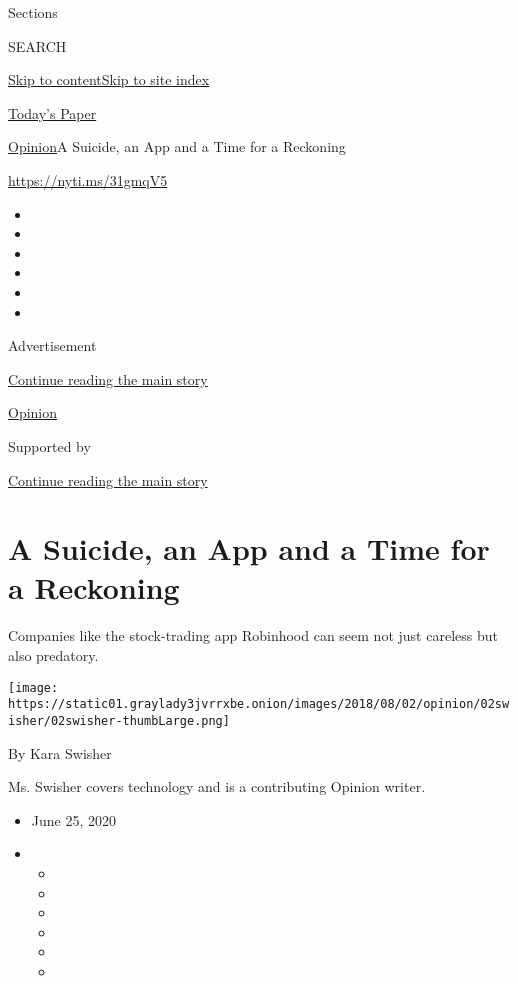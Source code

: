 Sections

SEARCH

\protect\hyperlink{site-content}{Skip to
content}\protect\hyperlink{site-index}{Skip to site index}

\href{https://myaccount.nytimes3xbfgragh.onion/auth/login?response_type=cookie\&client_id=vi}{}

\href{https://www.nytimes3xbfgragh.onion/section/todayspaper}{Today's
Paper}

\href{/section/opinion}{Opinion}\textbar{}A Suicide, an App and a Time
for a Reckoning

\url{https://nyti.ms/31gmqV5}

\begin{itemize}
\item
\item
\item
\item
\item
\item
\end{itemize}

Advertisement

\protect\hyperlink{after-top}{Continue reading the main story}

\href{/section/opinion}{Opinion}

Supported by

\protect\hyperlink{after-sponsor}{Continue reading the main story}

\hypertarget{a-suicide-an-app-and-a-time-for-a-reckoning}{%
\section{A Suicide, an App and a Time for a
Reckoning}\label{a-suicide-an-app-and-a-time-for-a-reckoning}}

Companies like the stock-trading app Robinhood can seem not just
careless but also predatory.

\texttt{[image: https://static01.graylady3jvrrxbe.onion/images/2018/08/02/opinion/02swisher/02swisher-thumbLarge.png]}

By Kara Swisher

Ms. Swisher covers technology and is a contributing Opinion writer.

\begin{itemize}
\item
  June 25, 2020
\item
  \begin{itemize}
  \item
  \item
  \item
  \item
  \item
  \item
  \end{itemize}
\end{itemize}

